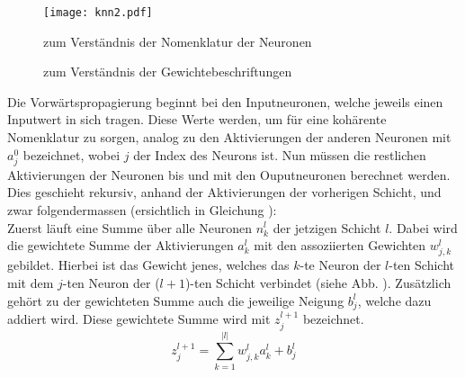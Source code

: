 \begin{figure}[h!]
  \centering
  \texttt{[image: knn2.pdf]}
  \caption{zum Verständnis der Nomenklatur der Neuronen}
  \label{fig:nomenklatur1}
\end{figure}
\para{}
\begin{figure}[h!]
  \centering
  \caption{zum Verständnis der Gewichtebeschriftungen}
  \label{fig:nomenklatur2}
\end{figure}
\para{}
Die Vorwärtspropagierung beginnt bei den Inputneuronen, welche jeweils
einen Inputwert in sich tragen. Diese Werte werden, um für eine kohärente Nomenklatur zu sorgen,
analog zu den Aktivierungen der anderen Neuronen mit $a_j^0$ bezeichnet, wobei
$j$ der Index des Neurons ist.
\para{}
Nun müssen die restlichen Aktivierungen der Neuronen bis und mit den
Ouputneuronen berechnet werden. Dies geschieht rekursiv, anhand der
Aktivierungen der vorherigen Schicht, und zwar folgendermassen (ersichtlich in
Gleichung ):\\
Zuerst läuft eine Summe über alle Neuronen $n_k^{l}$ der jetzigen Schicht
$l$. Dabei wird die gewichtete Summe der Aktivierungen $a_k^{l}$ mit den
assoziierten Gewichten $w_{j,k}^l$ gebildet. Hierbei ist das Gewicht jenes, welches das
$k$-te Neuron der $l$-ten Schicht mit dem $j$-ten Neuron der ($l+1$)-ten Schicht
verbindet (siehe Abb. ).
Zusätzlich gehört zu der gewichteten Summe auch die jeweilige Neigung $b_j^l$, welche
dazu addiert wird. Diese gewichtete Summe wird mit $z_j^{l+1}$ bezeichnet.
\\
\begin{equation}\tag{FP1}\label{eq:gewichtete_summe_normal}
  z_j^{l+1} = \sum_{k=1}^{|l|} w_{j,k}^l a_k^l + b_j^l
\end{equation}
\\
